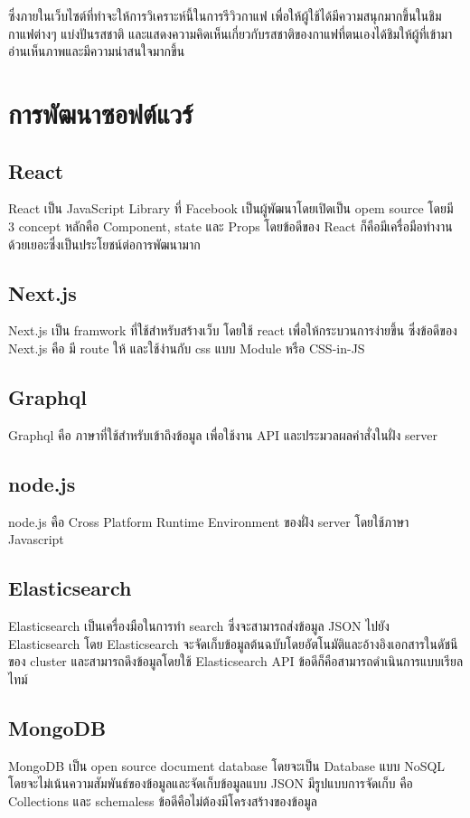 ซึ่งภายในเว็บไซต์ที่ทำจะให้การวิเคราะห์นี้ในการรีวิวกาแฟ เพื่อให้ผู้ใช้ได้มีความสนุกมากขึ้นในชิมกาแฟต่างๆ แบ่งปันรสชาติ และแสดงความคิดเห็นเกี่ยวกับรสชาติของกาแฟที่ตนเองได้ชิมให้ผู้ที่เข้ามาอ่านเห็นภาพและมีความน่าสนใจมากขึ้น

\section{การพัฒนาซอฟต์แวร์}
\subsection{React}
React เป็น JavaScript Library ที่ Facebook เป็นผู้พัฒนาโดยเปิดเป็น opem source โดยมี 3 concept หลักคือ Component, state และ Props โดยข้อดีของ React ก็คือมีเครื่อมือทำงานด้วยเยอะซึ่งเป็นประโยชน์ต่อการพัฒนามาก \cite{react}

\subsection{Next.js}
Next.js เป็น framwork ที่ใช้สำหรับสร้างเว็บ โดยใช้ react เพื่อให้กระบวนการง่ายขึ้น ซึ่งข้อดีของ Next.js คือ มี route ให้ และใช้ง่านกับ css แบบ Module หรือ CSS-in-JS \cite{nextjs}

\subsection{Graphql}
Graphql คือ ภาษาที่ใช้สำหรับเข้าถึงข้อมูล เพื่อใช้งาน API และประมวลผลคำสั่งในฝั่ง server \cite{graphql}

\subsection{node.js}
node.js คือ  Cross Platform Runtime Environment ของฝั่ง server โดยใช้ภาษา Javascript \cite{nodejs}

\subsection{Elasticsearch}
Elasticsearch เป็นเครื่องมือในการทำ search ซึ่งจะสามารถส่งข้อมูล JSON ไปยัง Elasticsearch โดย Elasticsearch จะจัดเก็บข้อมูลต้นฉบับโดยอัตโนมัติและอ้างอิงเอกสารในดัชนีของ cluster และสามารถดึงข้อมูลโดยใช้ Elasticsearch API ข้อดีก็คือสามารถดำเนินการแบบเรียลไทม์\cite{elastic}

\subsection{MongoDB}
MongoDB เป็น open source document database โดยจะเป็น Database แบบ NoSQL โดยจะไม่เน้นความสัมพันธ์ของข้อมูลและจัดเก็บข้อมูลแบบ JSON มีรูปแบบการจัดเก็บ คือ Collections และ schemaless ข้อดีคือไม่ต้องมีโครงสร้างของข้อมูล \cite{mongodb}

